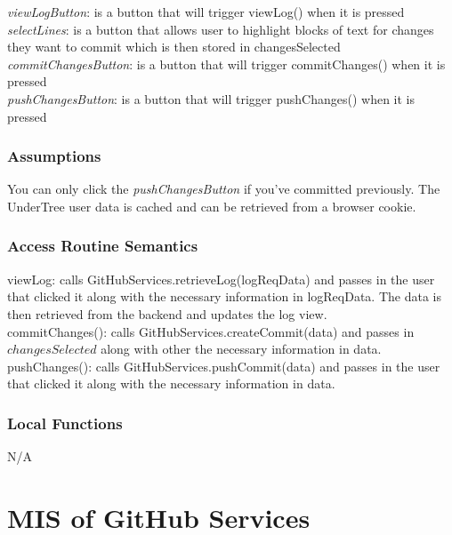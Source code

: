 \documentclass[12pt, titlepage]{article}
\begin{document}
	\noindent \textit{viewLogButton}: is a button that will trigger viewLog() when it is pressed \\
	
	\noindent \textit{selectLines}: is a button that allows user to highlight blocks of text for changes they want to commit which is then stored in changesSelected \\
	
	\noindent \textit{commitChangesButton}: is a button that will trigger commitChanges() when it is pressed \\
	
	\textit{pushChangesButton}: is a button that will trigger pushChanges() when it is pressed \\
	
	
	\subsubsection{Assumptions}
	
	You can only click the \textit{pushChangesButton} if you've committed previously. The UnderTree user data is cached and can be retrieved from a browser cookie.
	
	\subsubsection{Access Routine Semantics}
	
	\noindent viewLog: calls GitHubServices.retrieveLog(logReqData) and passes in the user that clicked it along with the necessary information in logReqData. The data is then retrieved from the backend and updates the log view. \\
	
	\noindent commitChanges(): calls GitHubServices.createCommit(data) and passes in $changesSelected$ along with other the necessary information in data. \\
	
	\noindent pushChanges(): calls GitHubServices.pushCommit(data) and passes in the user that clicked it along with the necessary information in data. \\
	\subsubsection{Local Functions}
	
	N/A
	
	\newpage
	
	\section{MIS of GitHub Services} \label{Module} 
	
\end{document}
